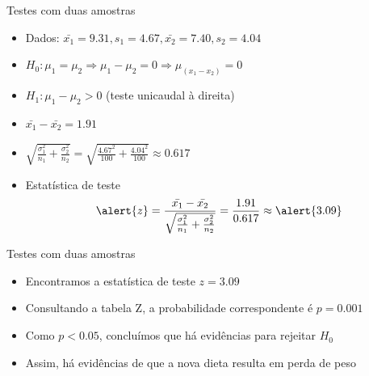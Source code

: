 \documentclass{beamer}
\begin{document}
\begin{frame}{Testes com duas amostras}
  \begin{example}
    \begin{itemize}
    \item Dados: $\bar{x_1}=9.31, s_1=4.67, \bar{x_2}=7.40, s_2 = 4.04$
    \item $H_0: \mu_1 = \mu_2 \Rightarrow \mu_1 - \mu_2 = 0 \Rightarrow \mu_{(x_1 - x_2)} = 0$
    \item $H_1: \mu_1 - \mu_2 > 0$ (teste unicaudal à direita)
    \item $\bar{x_1}-\bar{x_2}=1.91$
    \item $\sqrt{\frac{\sigma_1^2}{n_1} + \frac{\sigma^2_2}{n_2}} =
      \sqrt{\frac{4.67^2}{100} + \frac{4.04^2}{100}} \approx 0.617$
    \item Estatística de teste
      \begin{displaymath}
        \alert{z} = \frac{\bar{x_1}-\bar{x_2}}{\sqrt{\frac{\sigma_1^2}{n_1} +
            \frac{\sigma^2_2}{n_2}}} = \frac{1.91}{0.617} \approx \alert{3.09}
      \end{displaymath}
    \end{itemize}
  \end{example}
\end{frame}

\begin{frame}{Testes com duas amostras}
  \begin{example}
    \begin{itemize}
    \item Encontramos a estatística de teste $z=3.09$
    \item Consultando a tabela Z, a probabilidade correspondente é $p=0.001$
    \item Como $p<0.05$, concluímos que há evidências para rejeitar $H_0$
    \item Assim, há evidências de que a nova dieta resulta em perda de
      peso
    \end{itemize}
  \end{example}
\end{frame}

\end{document}

